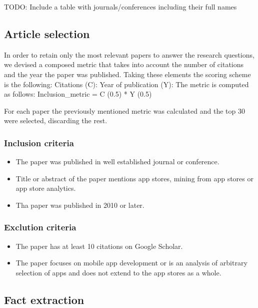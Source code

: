 \documentclass[]{book}
\providecommand{\tightlist}{%
  \setlength{\itemsep}{0pt}\setlength{\parskip}{0pt}}
\begin{document}
TODO: Include a table with journals/conferences including their full
names

\subsection{Article selection}\label{article-selection}

In order to retain only the most relevant papers to answer the research
questions, we devised a composed metric that takes into account the
number of citations and the year the paper was published. Taking these
elements the scoring scheme is the following: Citations (C): Year of
publication (Y): The metric is computed as follows: Inclusion\_metric =
C (0.5) * Y (0.5)

For each paper the previously mentioned metric was calculated and the
top 30 were selected, discarding the rest.

\subsubsection{Inclusion criteria}\label{inclusion-criteria-1}

\begin{itemize}
\tightlist
\item
  The paper was published in well established journal or conference.
\item
  Title or abstract of the paper mentions app stores, mining from app
  stores or app store analytics.
\item
  Tha paper was published in 2010 or later.
\end{itemize}

\subsubsection{Exclution criteria}\label{exclution-criteria}

\begin{itemize}
\tightlist
\item
  The paper has at least 10 citations on Google Scholar.
\item
  The paper focuses on mobile app development or is an analysis of
  arbitrary selection of apps and does not extend to the app stores as a
  whole.
\end{itemize}

\subsection{Fact extraction}\label{fact-extraction}
\end{document}
